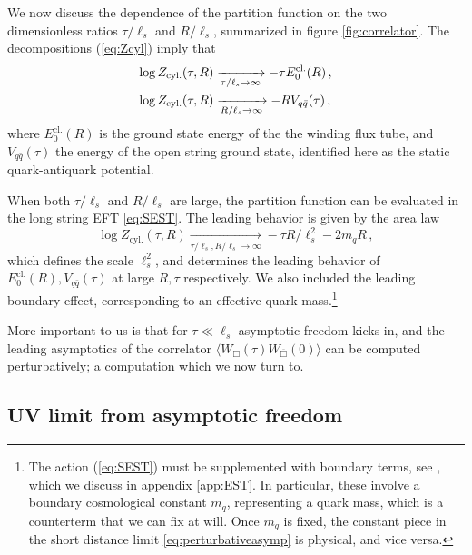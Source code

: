 \documentclass[
 reprint,
 amsmath,
 pre,
 amssymb,
 nofootinbib,
 aps,
 longbibliography,
]{revtex4-1}
\newcommand{\<}{{\langle}}
\renewcommand{\>}{{\rangle}}
\begin{document}
We now discuss the dependence of the partition function  on the two dimensionless ratios $\tau/\ell_s$ and $R/\ell_s$, summarized in figure \ref{fig:correlator}. The decompositions (\ref{eq:Zcyl}) imply that
\begin{align}
     \log Z_{\text{cyl.}}(\tau,R) &\xrightarrow[{\tau}/{\ell_s} \to \infty]{} -\tau E_0^\text{cl.}(R)\,, \label{{eq:larget}}\\
      \log Z_{\text{cyl.}}(\tau,R) &\xrightarrow[{R}/{\ell_s} \to \infty]{} -{R V_{q\bar{q} \label{{eq:largeR}}
      }( \tau)}\,,
\end{align}
where $E_0^\text{cl.}(R)$ is the ground state energy of the the winding flux tube, and $V_{q \bar{q}}(\tau)$ the energy of the open string ground state, identified here as the static quark-antiquark potential.

When both $\tau/\ell_s$ and $R/\ell_s$ are large, the partition function can be evaluated in the long string EFT \eqref{eq:SEST}. The leading behavior is given by the area law
    \begin{equation}
         \log Z_{\text{cyl.}}(\tau,R) \xrightarrow[{\tau}/{\ell_s}, {R}/{\ell_s} \to \infty ]{} -\tau R /\ell_s^2  -2m_q R\,, \label{eq:largetR}
    \end{equation}
    which defines the scale $\ell_s^2$, and determines the leading behavior of $E_0^\text{cl.}(R), V_{q\bar{q}}(\tau)$ at large $R, \tau$ respectively. We also included the leading boundary effect, corresponding to an effective quark mass.\footnote{\label{foot:mq}The action (\ref{eq:SEST}) must be supplemented with boundary terms, see  \cite{Luscher:2002qv,Luscher:2004ib,Aharony:2010cx}, which we discuss in appendix \ref{app:EST}. In particular, these involve a boundary cosmological constant $m_q$, representing a quark mass, which is a counterterm that we can fix at will. Once $m_q$ is fixed, the constant piece in the short distance limit \eqref{eq:perturbativeasymp} is physical, and vice versa.}

 More important to us is that for $\tau \ll \ell_s$
 asymptotic freedom kicks in, and the leading asymptotics of the correlator $\langle W_{\Box}(\tau) W_{\overline{\Box}}(0)\rangle$ can be computed perturbatively; a computation which we now turn to.

\enlargethispage{-0.7in}

\subsection{UV limit from asymptotic freedom}
\label{sec:IIB}
\end{document}
